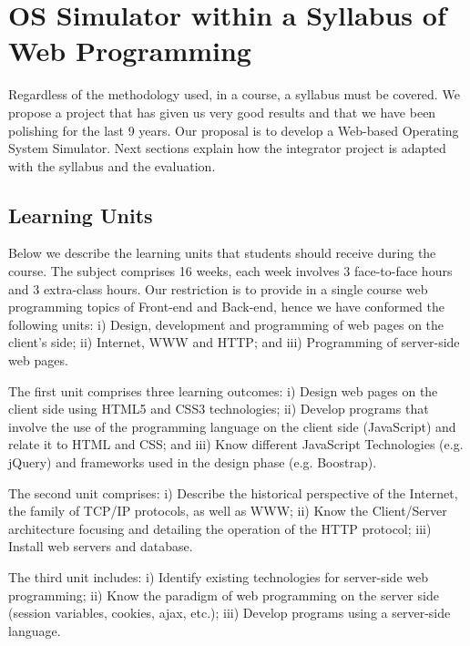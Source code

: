 \section{OS Simulator within a Syllabus of Web Programming}
\label{sec:GralExplanation}
Regardless of the methodology used, in a course, a syllabus must be covered.
We propose a project that has given us very good results and that we have been polishing 
for the last 9 years. Our proposal is to develop a Web-based Operating System Simulator.
Next sections explain how the integrator project is adapted with the syllabus and the
evaluation.

\subsection{Learning Units}
\label{ssec:learningUnits}
Below we describe the learning units that students should receive during the course.
The subject comprises 16 weeks, each week involves 3 face-to-face hours and 
3 extra-class hours. Our restriction is to provide in a single course web 
programming topics of Front-end and Back-end, hence we have conformed the 
following units: 
i) Design, development and programming of web pages on the client's side; 
ii) Internet, WWW and HTTP; and 
iii) Programming of server-side web pages.

The first unit comprises three learning outcomes: 
i) Design web pages on the client side using HTML5 and CSS3 technologies;
ii) Develop programs that involve the use of the programming language on the 
client side (JavaScript) and relate it to HTML and CSS; and 
iii) Know different JavaScript Technologies (e.g. jQuery) and frameworks used 
in the design phase (e.g. Boostrap).

The second unit comprises: 
i) Describe the historical perspective of the Internet, the family of 
TCP/IP protocols, as well as WWW; 
ii) Know the Client/Server architecture focusing and detailing the operation 
of the HTTP protocol; 
iii) Install web servers and database.

The third unit includes: 
i) Identify existing technologies for server-side web programming; 
ii) Know the paradigm of web programming on the server side (session variables, 
cookies, ajax, etc.); 
iii) Develop programs using a server-side language.

